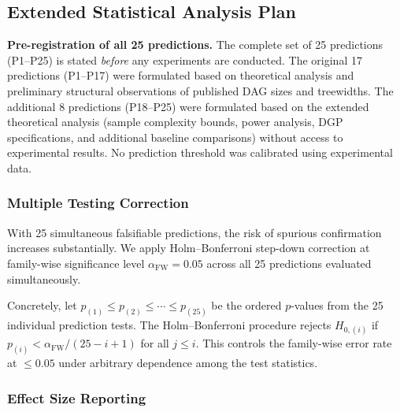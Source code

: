 \documentclass[11pt,a4paper]{article}
\theoremstyle{definition}
\theoremstyle{remark}
\begin{document}
\subsection{Extended Statistical Analysis Plan}\label{sec:extended_sap}

\noindent\textbf{Pre-registration of all 25 predictions.} The complete
set of 25 predictions (P1--P25) is stated \emph{before} any experiments
are conducted. The original 17 predictions (P1--P17) were formulated
based on theoretical analysis and preliminary structural observations
of published DAG sizes and treewidths. The additional 8 predictions
(P18--P25) were formulated based on the extended theoretical analysis
(sample complexity bounds, power analysis, DGP specifications, and
additional baseline comparisons) without access to experimental results.
No prediction threshold was calibrated using experimental data.

\subsubsection{Multiple Testing Correction}

With 25 simultaneous falsifiable predictions, the risk of spurious
confirmation increases substantially. We apply Holm--Bonferroni
step-down correction \cite{holm1979} at family-wise significance level
$\alpha_{\mathrm{FW}} = 0.05$ across all 25 predictions evaluated
simultaneously.

Concretely, let $p_{(1)} \leq p_{(2)} \leq \cdots \leq p_{(25)}$ be
the ordered $p$-values from the 25 individual prediction tests. The
Holm--Bonferroni procedure rejects $H_{0,(i)}$ if
$p_{(i)} < \alpha_{\mathrm{FW}} / (25 - i + 1)$ for all $j \leq i$.
This controls the family-wise error rate at $\leq 0.05$ under
arbitrary dependence among the test statistics.

\subsubsection{Effect Size Reporting}
\end{document}
